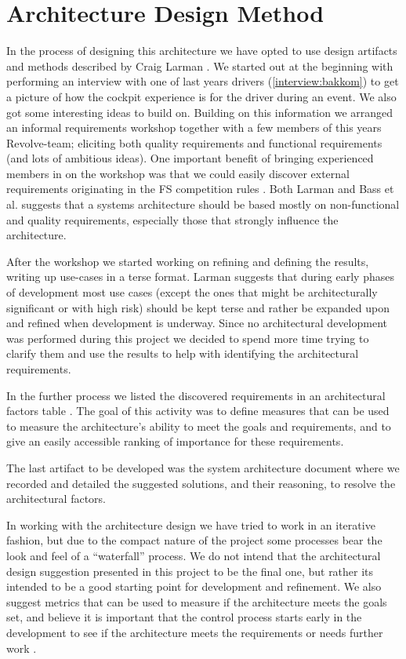 \section{Architecture Design Method}
In the process of designing this architecture we have opted to use design
artifacts and methods described by Craig Larman \cite{Larman:UML}. We started
out at the beginning with performing an interview with one of last years 
drivers (\vref{interview:bakkom}) to get a picture of how the cockpit 
experience is for the driver during
an event. We also got some interesting ideas to build on. Building on this
information we arranged an informal requirements workshop together with a few 
members of this years Revolve-team; eliciting both quality requirements and
functional requirements (and lots of ambitious ideas). One important benefit of
bringing experienced members in on the workshop was that we could easily
discover external requirements originating in the FS competition rules \cite{fsae:2014rules}.
Both Larman and Bass et al. suggests that a systems
architecture should be based mostly on non-functional and quality requirements,
especially those that strongly influence the architecture.
\cite[p.20]{bass2012software}\cite[pp. 541-554]{Larman:UML}

After the workshop we started working on refining and defining the results,
writing up use-cases in a terse format. Larman suggests \cite[pp. 95-95]{Larman:UML}
that during early phases of development most use cases (except the ones that 
might be architecturally significant or with high risk) should be kept terse 
and rather be expanded upon and refined when development is underway. Since no
architectural development was performed during this project we decided to spend
more time trying to clarify them and use the results to help with identifying
the architectural requirements.

In the further process we listed the discovered requirements in an
architectural factors table \cite[pp. 56-59, 545-547]{Larman:UML}. The goal of
this activity was to define measures that can be used to measure the
architecture's ability to meet the goals and requirements, and to give an
easily accessible ranking of importance for these requirements.

The last artifact to be developed was the system architecture document \cite[p. 550]{Larman:UML} where we
recorded and detailed the suggested solutions, and their reasoning, to resolve the architectural
factors.

In working with the architecture design we have tried to work in an iterative
fashion, but due to the compact nature of the project some processes bear the
look and feel of a ``waterfall'' process. We do not intend that the
architectural design suggestion presented in this project to be the final one, 
but rather its intended to be a good
starting point for development and refinement. We also suggest metrics that can
be used to measure if the architecture meets the goals set, and believe it is important
that the control process starts early in the development to see if the
architecture meets the requirements or needs further work 
\cite[pp. 556-557]{Larman:UML}.

